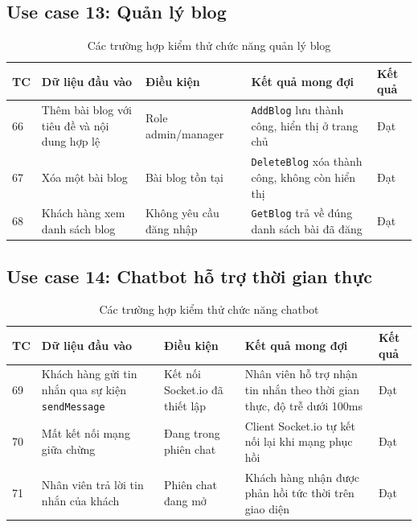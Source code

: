 \documentclass[../DoAn.tex]{subfiles}
\begin{document}
\subsection*{Use case 13: Quản lý blog}

\begin{table}[H]
\centering
\caption{Các trường hợp kiểm thử chức năng quản lý blog}
\label{tab:test-blog}
\scriptsize
\begin{tabular}{|p{0.5cm}|p{3.5cm}|p{3cm}|p{3.5cm}|p{2cm}|}
\hline
\textbf{TC} & \textbf{Dữ liệu đầu vào} & \textbf{Điều kiện} & \textbf{Kết quả mong đợi} & \textbf{Kết quả} \\
\hline
66 & Thêm bài blog với tiêu đề và nội dung hợp lệ & Role admin/manager & \texttt{AddBlog} lưu thành công, hiển thị ở trang chủ & Đạt \\
\hline
67 & Xóa một bài blog & Bài blog tồn tại & \texttt{DeleteBlog} xóa thành công, không còn hiển thị & Đạt \\
\hline
68 & Khách hàng xem danh sách blog & Không yêu cầu đăng nhập & \texttt{GetBlog} trả về đúng danh sách bài đã đăng & Đạt \\
\hline
\end{tabular}
\end{table}

\subsection*{Use case 14: Chatbot hỗ trợ thời gian thực}

\begin{table}[H]
\centering
\caption{Các trường hợp kiểm thử chức năng chatbot}
\label{tab:test-chatbot}
\scriptsize
\begin{tabular}{|p{0.5cm}|p{3.5cm}|p{3cm}|p{3.5cm}|p{2cm}|}
\hline
\textbf{TC} & \textbf{Dữ liệu đầu vào} & \textbf{Điều kiện} & \textbf{Kết quả mong đợi} & \textbf{Kết quả} \\
\hline
69 & Khách hàng gửi tin nhắn qua sự kiện \texttt{sendMessage} & Kết nối Socket.io đã thiết lập & Nhân viên hỗ trợ nhận tin nhắn theo thời gian thực, độ trễ dưới 100ms & Đạt \\
\hline
70 & Mất kết nối mạng giữa chừng & Đang trong phiên chat & Client Socket.io tự kết nối lại khi mạng phục hồi & Đạt \\
\hline
71 & Nhân viên trả lời tin nhắn của khách & Phiên chat đang mở & Khách hàng nhận được phản hồi tức thời trên giao diện & Đạt \\
\hline
\end{tabular}
\end{table}
\end{document}

